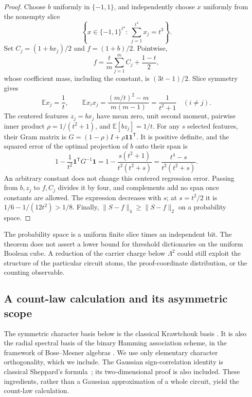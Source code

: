 \documentclass[11pt,letterpaper]{article}
\theoremstyle{definition}
\theoremstyle{remark}
\begin{document}
\begin{proof}
Choose $b$ uniformly in $\{-1,1\}$, and independently choose $x$ uniformly
from the nonempty slice
\[
 \left\{x\in\{-1,1\}^{t^4}:\ \sum_{j=1}^{t^4}x_j=t^3\right\}.
\]
Set $C_j=(1+bx_j)/2$ and $f=(1+b)/2$.  Pointwise,
\[
 f=\frac{t}{m}\sum_{j=1}^m C_j+\frac{1-t}{2},
\]
whose coefficient mass, including the constant, is $(3t-1)/2$.
Slice symmetry gives
\[
 \mathbb E x_j=\frac1t,
 \qquad
 \mathbb E x_i x_j
 =\frac{(m/t)^2-m}{m(m-1)}=\frac1{t^2+1}\quad(i\ne j).
\]
The centered features $z_j=bx_j$ have mean zero, unit second moment,
pairwise inner product $\rho=1/(t^2+1)$, and
$\mathbb E[bz_j]=1/t$.  For any $s$ selected features, their Gram matrix is
$G=(1-\rho)I+\rho\mathbf1\mathbf1^{\mathsf T}$.  It is positive definite,
and the squared error of the optimal projection of $b$ onto their span is
\[
 1-\frac1{t^2}\mathbf1^{\mathsf T}G^{-1}\mathbf1
 =1-\frac{s(t^2+1)}{t^2(t^2+s)}
 =\frac{t^4-s}{t^2(t^2+s)}.
\]
An arbitrary constant does not change this centered regression error.
Passing from $b,z_j$ to $f,C_j$ divides it by four, and complements add
no span once constants are allowed.  The expression decreases with $s$;
at $s=t^2/2$ it is $1/6-1/(12t^2)>1/8$.  Finally,
$\|S-f\|_4\ge\|S-f\|_2$ on a probability space.
\end{proof}

The probability space is a uniform finite slice times an independent bit.
The theorem does not assert a lower bound for threshold dictionaries on
the uniform Boolean cube.  A reduction of the carrier charge below
$\Lambda^2$ could still exploit the structure of the particular circuit
atoms, the proof-coordinate distribution, or the counting observable.

\subsection{A count-law calculation and its asymmetric scope}
\label{lim:aggregate}

The symmetric character basis below is the classical Krawtchouk basis
\cite{Krawtchouk}.  It is also the radial spectral basis of the binary
Hamming association scheme, in the framework of Bose--Mesner algebras
\cite{BoseMesner1959}.  We use only elementary character orthogonality,
which we include.  The Gaussian sign-correlation identity is classical
Sheppard's formula~\cite{Sheppard1899}; its two-dimensional proof is also
included.  These ingredients, rather than a Gaussian approximation of a
whole circuit, yield the count-law calculation.
\end{document}
